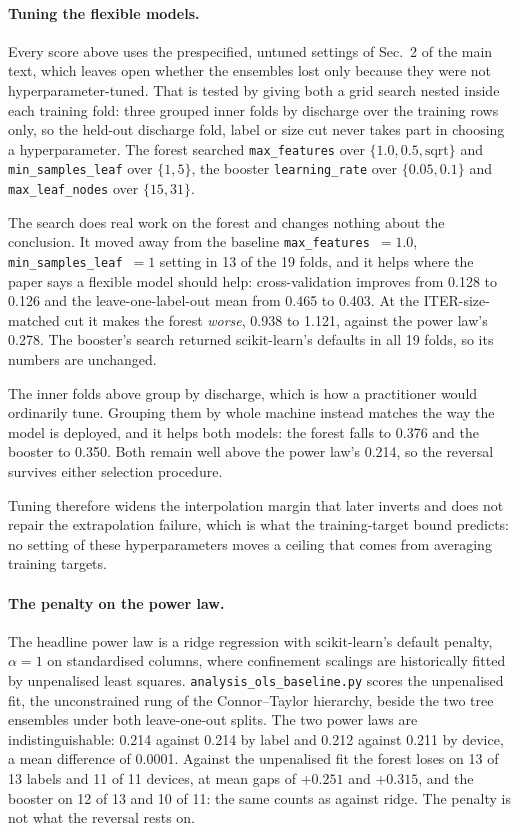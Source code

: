 \documentclass[12pt,letterpaper]{article}
\begin{document}
\paragraph{Tuning the flexible models.} Every score above uses the
prespecified, untuned settings of Sec.~2 of the main text, which leaves open
whether the ensembles lost only because they were not hyperparameter-tuned. That is tested by giving both a grid search
nested inside each training fold: three grouped inner folds by discharge over
the training rows only, so the held-out discharge fold, label or size cut
never takes part in choosing a hyperparameter. The forest searched
\texttt{max\_features} over $\{1.0, 0.5, \text{sqrt}\}$ and
\texttt{min\_samples\_leaf} over $\{1, 5\}$, the booster
\texttt{learning\_rate} over $\{0.05, 0.1\}$ and \texttt{max\_leaf\_nodes} over
$\{15, 31\}$.

The search does real work on the forest and changes nothing about the
conclusion. It moved away from the baseline \texttt{max\_features}~$=1.0$,
\texttt{min\_samples\_leaf}~$=1$ setting in 13 of the 19 folds, and it helps where
the paper says a flexible model should help: cross-validation improves from
0.128 to 0.126 and the leave-one-label-out mean from 0.465 to 0.403. At the
ITER-size-matched cut it makes the forest \emph{worse}, 0.938 to 1.121, against the
power law's 0.278. The booster's search returned scikit-learn's defaults in all
19 folds, so its numbers are unchanged.

The inner folds above group by discharge, which is how a practitioner would
ordinarily tune. Grouping them by whole machine instead matches the way the
model is deployed, and it helps both models: the forest falls to 0.376 and the
booster to 0.350. Both remain well above the power law's 0.214, so the reversal
survives either selection procedure.

Tuning therefore widens the interpolation margin that later inverts and does
not repair the extrapolation failure, which is what the training-target bound
predicts: no setting of these hyperparameters moves a ceiling that comes from
averaging training targets.

\paragraph{The penalty on the power law.} The headline power law is a ridge
regression with scikit-learn's default penalty, $\alpha=1$ on standardised
columns, where confinement scalings are historically fitted by unpenalised
least squares. \texttt{analysis\_ols\_baseline.py} scores the unpenalised
fit, the unconstrained rung of the Connor--Taylor hierarchy, beside the two
tree ensembles under both leave-one-out splits. The two power laws are
indistinguishable: 0.214 against 0.214 by label and 0.212 against 0.211 by
device, a mean difference of 0.0001. Against the unpenalised fit the forest
loses on 13 of 13 labels and 11 of 11 devices, at mean gaps of $+0.251$ and
$+0.315$, and the booster on 12 of 13 and 10 of 11: the same counts as against
ridge. The penalty is not what the reversal rests on.
\end{document}
